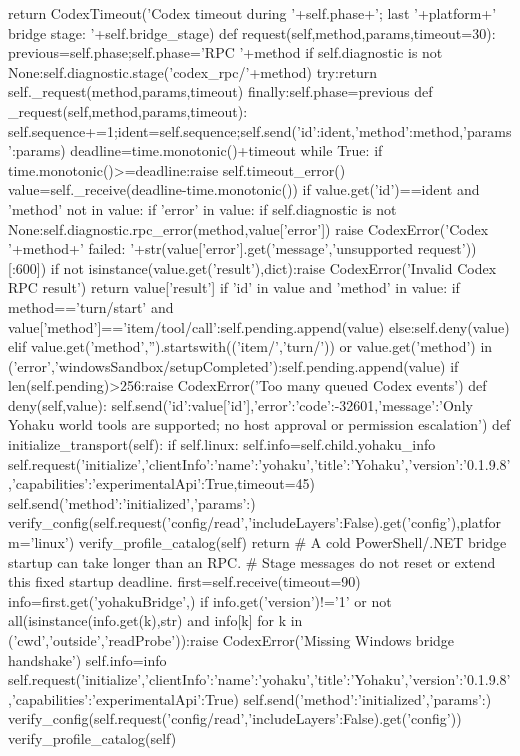         return CodexTimeout('Codex timeout during '+self.phase+'; last '+platform+' bridge stage: '+self.bridge_stage)
    def request(self,method,params,timeout=30):
        previous=self.phase;self.phase='RPC '+method
        if self.diagnostic is not None:self.diagnostic.stage('codex_rpc/'+method)
        try:return self._request(method,params,timeout)
        finally:self.phase=previous
    def _request(self,method,params,timeout):
        self.sequence+=1;ident=self.sequence;self.send({'id':ident,'method':method,'params':params})
        deadline=time.monotonic()+timeout
        while True:
            if time.monotonic()>=deadline:raise self.timeout_error()
            value=self._receive(deadline-time.monotonic())
            if value.get('id')==ident and 'method' not in value:
                if 'error' in value:
                    if self.diagnostic is not None:self.diagnostic.rpc_error(method,value['error'])
                    raise CodexError('Codex '+method+' failed: '+str(value['error'].get('message','unsupported request'))[:600])
                if not isinstance(value.get('result'),dict):raise CodexError('Invalid Codex RPC result')
                return value['result']
            if 'id' in value and 'method' in value:
                if method=='turn/start' and value['method']=='item/tool/call':self.pending.append(value)
                else:self.deny(value)
            elif value.get('method','').startswith(('item/','turn/')) or value.get('method') in ('error','windowsSandbox/setupCompleted'):self.pending.append(value)
            if len(self.pending)>256:raise CodexError('Too many queued Codex events')
    def deny(self,value):
        self.send({'id':value['id'],'error':{'code':-32601,'message':'Only Yohaku world tools are supported; no host approval or permission escalation'}})
    def initialize_transport(self):
        if self.linux:
            self.info=self.child.yohaku_info
            self.request('initialize',{'clientInfo':{'name':'yohaku','title':'Yohaku','version':'0.1.9.8'},'capabilities':{'experimentalApi':True}},timeout=45)
            self.send({'method':'initialized','params':{}})
            verify_config(self.request('config/read',{'includeLayers':False}).get('config'),platform='linux')
            verify_profile_catalog(self)
            return
        # A cold PowerShell/.NET bridge startup can take longer than an RPC.
        # Stage messages do not reset or extend this fixed startup deadline.
        first=self.receive(timeout=90)
        info=first.get('yohakuBridge',{})
        if info.get('version')!='1' or not all(isinstance(info.get(k),str) and info[k] for k in ('cwd','outside','readProbe')):raise CodexError('Missing Windows bridge handshake')
        self.info=info
        self.request('initialize',{'clientInfo':{'name':'yohaku','title':'Yohaku','version':'0.1.9.8'},'capabilities':{'experimentalApi':True}})
        self.send({'method':'initialized','params':{}})
        verify_config(self.request('config/read',{'includeLayers':False}).get('config'))
        verify_profile_catalog(self)

